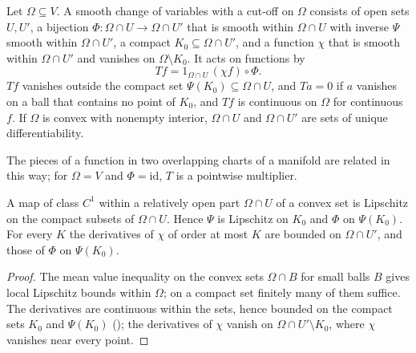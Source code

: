 \begin{definition}
\label{def:cutoff-diffeo}
\leanok
Let $\Omega \subseteq V$. A smooth change of variables with a cut-off on $\Omega$ consists of open
sets $U, U'$, a bijection $\Phi : \Omega \cap U \to \Omega \cap U'$ that is smooth within
$\Omega \cap U$ with inverse $\Psi$ smooth within $\Omega \cap U'$, a compact
$K_0 \subseteq \Omega \cap U'$, and a function $\chi$ that is smooth within $\Omega \cap U'$ and
vanishes on $\Omega \setminus K_0$. It acts on functions by
\[
  T f = 1_{\Omega \cap U}\, (\chi f) \circ \Phi .
\]
$T f$ vanishes outside the compact set $\Psi(K_0) \subseteq \Omega \cap U$, and $T a = 0$ if $a$
vanishes on a ball that contains no point of $K_0$, and $T f$ is continuous on $\Omega$ for
continuous $f$. If $\Omega$ is convex with nonempty interior, $\Omega \cap U$ and $\Omega \cap U'$
are sets of unique differentiability.
\end{definition}

The pieces of a function in two overlapping charts of a manifold are related in this way; for
$\Omega = V$ and $\Phi = \mathrm{id}$, $T$ is a pointwise multiplier.

\begin{lemma}
\label{lem:cutoff-diffeo-bounds}
\leanok
{}
A map of class $C^1$ within a relatively open part $\Omega \cap U$ of a convex set is Lipschitz on
the compact subsets of $\Omega \cap U$. Hence $\Psi$ is Lipschitz on $K_0$ and $\Phi$ on
$\Psi(K_0)$. For every $K$ the derivatives of $\chi$ of order at most $K$ are bounded on
$\Omega \cap U'$, and those of $\Phi$ on $\Psi(K_0)$.
\end{lemma}

\begin{proof}
\leanok
The mean value inequality on the convex sets $\Omega \cap B$ for small balls $B$ gives local
Lipschitz bounds within $\Omega$; on a compact set finitely many of them suffice. The derivatives
are continuous within the sets, hence bounded on the compact sets $K_0$ and $\Psi(K_0)$
(); the
derivatives of $\chi$ vanish on $\Omega \cap U' \setminus K_0$, where $\chi$ vanishes near
every point.
\end{proof}

